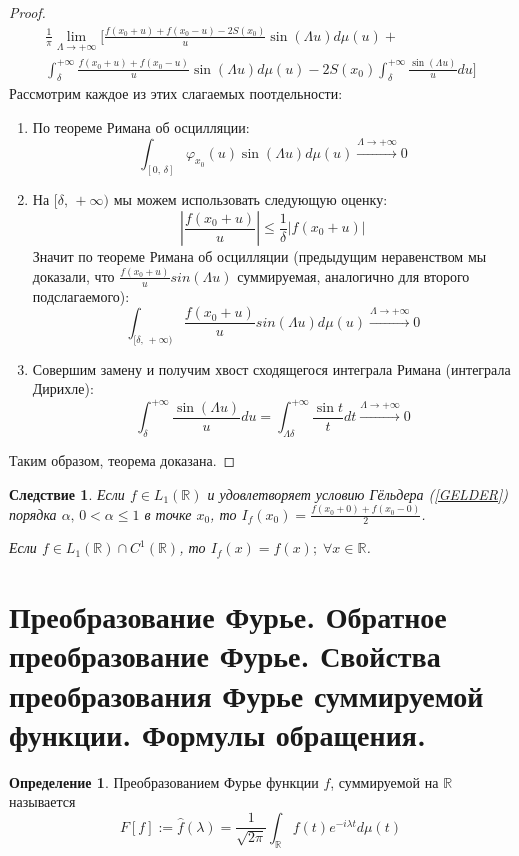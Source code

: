 \documentclass[a4paper,12pt]{article}
\renewcommand{\phi}{\ensuremath{\varphi}}
\renewcommand{\leq}{\ensuremath{\leqslant}}
\theoremstyle{plain}
\newtheorem*{corollary}{Следствие}
\theoremstyle{definition}
\newtheorem{definition}{Определение}[section]
\theoremstyle{remark}
\begin{document}
\begin{proof}
\begin{align*}
		\frac{1}{\pi}\lim_{\Lambda \to +\infty}\Big[\frac{f(x_0 + u) + f(x_0 - u) - 2S(x_0)}{u}\sin(\Lambda u)d\mu(u) + \\
			\int_{\delta}^{+\infty} \frac{f(x_0 + u) + f(x_0 - u)}{u}\sin(\Lambda u)d\mu(u) - 2S(x_0)\int_\delta^{+\infty}\frac{\sin(\Lambda u)}{u}du\Big]
	\end{align*}
	Рассмотрим каждое из этих слагаемых поотдельности:
	\begin{enumerate}
		\item По теореме Римана об осцилляции:
		      \[\int_{[0,\,\delta]}\phi_{x_0}(u)\sin(\Lambda u)d\mu(u) \stackrel{\Lambda \to +\infty}{\to} 0\]
		\item На $[\delta,\, +\infty)$ мы можем использовать следующую оценку:
		      \[\left|\frac{f(x_0 + u)}{u}\right| \leq \frac{1}{\delta}|f(x_0 + u)|\]
		      Значит по теореме Римана об осцилляции (предыдущим неравенством мы доказали, что $\frac{f(x_0 + u)}{u}sin(\Lambda u)$ суммируемая, аналогично для второго подслагаемого):
		      \[\int_{[\delta,\, +\infty)} \frac{f(x_0 + u)}{u}sin(\Lambda u) d\mu(u) \stackrel{\Lambda \to +\infty}{\to} 0\]
		\item Совершим замену и получим хвост сходящегося интеграла Римана (интеграла Дирихле):
		      \[\int_\delta^{+\infty}\frac{\sin(\Lambda u)}{u}du = \int_{\Lambda\delta}^{+\infty}\frac{\sin t}{t}dt \stackrel{\Lambda \to +\infty}{\to} 0\]
	\end{enumerate}
	Таким образом, теорема доказана.
\end{proof}

\begin{corollary}
	Если $f \in L_1(\mathbb{R})$ и удовлетворяет условию Гёльдера (\ref{GELDER}) порядка $\alpha,\, 0 < \alpha \leq 1$ в точке $x_0$, то $I_f(x_0) = \frac{f(x_0 + 0) + f(x_0 - 0)}{2}$.

	Если $f \in L_1(\mathbb{R}) \cap C^1(\mathbb{R})$, то $I_f(x) = f(x) ;\;\forall x \in \mathbb{R}$.
\end{corollary}

\section{Преобразование Фурье. Обратное преобразование Фурье. Свойства преобразования Фурье суммируемой функции. Формулы обращения.}
\begin{definition}
	Преобразованием Фурье функции $f$, суммируемой на $\mathbb{R}$ называется
	\[F[f] := \hat{f}(\lambda) = \frac{1}{\sqrt{2\pi}}\int_\mathbb{R}f(t)e^{-i\lambda t}d\mu(t)\]
\end{definition}
\end{document}
